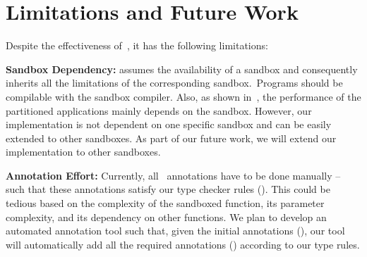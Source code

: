 \section{Limitations and Future Work}
\label{sec:limitations}
Despite the effectiveness of~\systemname{}, it has the following limitations:

\noindent\textbf{Sandbox Dependency:} \systemname{} assumes the availability of a sandbox and consequently inherits all the limitations of the corresponding sandbox.~\eg Programs should be compilable with the sandbox compiler.
Also, as shown in~, the performance of the partitioned applications mainly depends on the sandbox.
However, our implementation is not dependent on one specific sandbox and can be easily extended to other sandboxes. As part of our future work, we will extend our implementation to other sandboxes.

\noindent\textbf{Annotation Effort:} Currently, all~ annotations have to be done manually -- such that these annotations satisfy our type checker rules ().
This could be tedious based on the complexity of the sandboxed function, its parameter complexity, and its dependency on other functions.
We plan to develop an automated annotation tool such that, given the initial annotations (), our tool will automatically add all the required annotations () according to our type rules.
